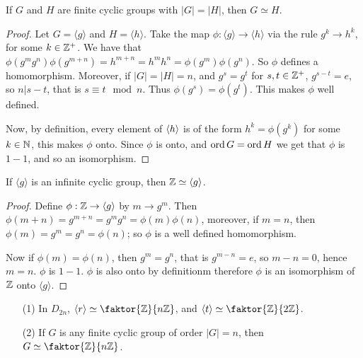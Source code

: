 \begin{theorem}\label{lemma_2.3.5}
  If $G$ and  $H$ are finite cyclic groups with  $|G|=|H|$, then $G
  \simeq H$.
\end{theorem}
\begin{proof}
  Let $G=\langle g \rangle$ and $H=\langle h \rangle$. Take the map
  $\phi:\langle g \rangle \rightarrow \langle h \rangle$ via the rule
  $g^k \rightarrow h^k$, for some $k \in \mathbb{Z}^+$. We have that
  $\phi(g^mg^n)\phi(g^{m+n})=h^{m+n}=h^mh^n=\phi(g^m)\phi(g^n)$. So $\phi$
  defines a homomorphism. Moreover, if $|G|=|H|=n$, and $g^s=g^t$ for
  $s,t \in \mathbb{Z}^+$,  $g^{s-t}=e$, so $n|s-t$, that is  $s \equiv t \mod{n}$.
  Thus $\phi(g^s)=\phi(g^t)$. This makes $\phi$ well defined.

  Now, by definition, every element of  $\langle h\rangle$ is of the form
  $h^k=\phi(g^k)$ for some $k \in \mathbb{N}$, this makes  $\phi$ onto. Since  $\phi$
  is onto, and  $\operatorname{ord}{G}=\operatorname{ord}{H}$ we get that $\phi$ is  $1-1$, and so an
  isomorphism.
\end{proof}
\begin{corollary}
  If $\langle g \rangle$ is an infinite cyclic group, then $\mathbb{Z} \simeq
  \langle g \rangle$.
\end{corollary}
\begin{proof}
  Define $\phi:\mathbb{Z} \rightarrow \langle g \rangle$ by $m \rightarrow g^m$. Then
  $\phi(m+n)=g^{m+n}=g^mg^n=\phi(m)\phi(n)$, moreover, if $m=n$, then
  $\phi(m)=g^m=g^n=\phi(n)$; so $\phi$ is a well defined homomorphism.

  Now if  $\phi(m)=\phi(n)$, then $g^m=g^n$, that is  $g^{m-n}=e$, so $m-n=0$,
  hence  $m=n$.  $\phi$ is  $1-1$.  $\phi$ is also onto by definitionm
  therefore  $\phi$ is an isomorphism of  $\mathbb{Z}$ onto $\langle g \rangle$.
\end{proof}

\begin{example}
  \begin{enumerate}
    \item[(1)] In $D_{2n}$, $\langle r \rangle \simeq
      \faktor{\Z}{n\Z}$, and $\langle t \rangle \simeq
      \faktor{\Z}{2\Z}$.

    \item[(2)] If $G$ is any finite cyclic group of order $|G|=n$,
      then $G \simeq \faktor{\Z}{n\Z}$.
  \end{enumerate}
\end{example}

